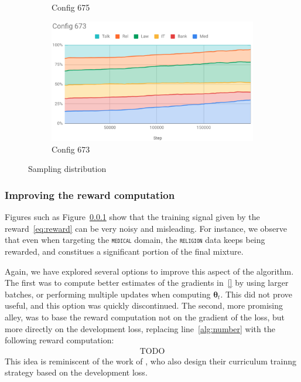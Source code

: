 \documentclass[11pt,a4paper]{article}
\newcommand{\fyTodo}[1]{\Todo[FY:]{\textcolor{orange}{#1}}}
\newcommand{\domain}[1]{\texttt{\textsc{#1}}}
\newcommand{\vtheta}{\ensuremath{\boldsymbol\theta}\xspace} %
\begin{document}
\begin{figure}[htb]
\begin{subfigure}{.5\textwidth}
  \caption{Config 675}
  \label{fig:675}
\end{subfigure}
\begin{subfigure}{.5\textwidth}
  \centering
  \includegraphics[width=.8\linewidth]{config673.png}  
  \caption{Config 673}
  \label{fig:673}
\end{subfigure}
\caption{Sampling distribution}
\label{fig:sampling}
\end{figure}

\subsubsection{Improving the reward computation}

Figures such as Figure~\ref{} show that the training signal given by the reward~\ref{eq:reward} can be very noisy and misleading. For instance, we observe that even when targeting the \domain{medical} domain, the \domain{religion} data keeps being rewarded, and constitues a significant portion of the final mixture.\fyTodo{Which figure, which equation ?}\fyTodo{Do we have number that show variance and strong divergence wrt initial training point ?}

Again, we have explored several options to improve this aspect of the algorithm. The first was to compute better estimates of the gradients in~\eqref{} by using larger batches, or performing multiple updates when computing $\vtheta_t$. This did not prove useful, and this option was quickly discontinued. The second, more promising alley, was to base the reward computation not on the gradient of the loss, but more directly on the development loss, replacing line~\ref{alg:number}\fyTodo{which line ?} with the following reward computation:
\begin{align*}
  \operatorname{TODO}
\end{align*}
This idea is reminiscent of the work of \citet{Kumar19reinforcement}, who also design their curriculum trainng strategy based on the development loss.
\end{document}
